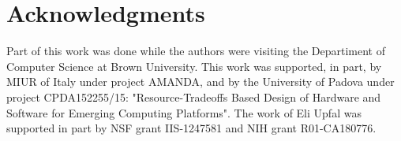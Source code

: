 \documentclass{article}
\begin{document}
\section{Acknowledgments}

Part of this work was done while the authors were
visiting the Departiment of Computer Science
at Brown University.
This work was supported, in part, by MIUR of Italy under
project AMANDA, and by the University of Padova under project
CPDA152255/15: "Resource-Tradeoffs Based Design
of Hardware and Software for Emerging Computing Platforms".
The work of Eli Upfal was supported in part by NSF grant IIS-1247581
and NIH grant R01-CA180776.




\end{document}
